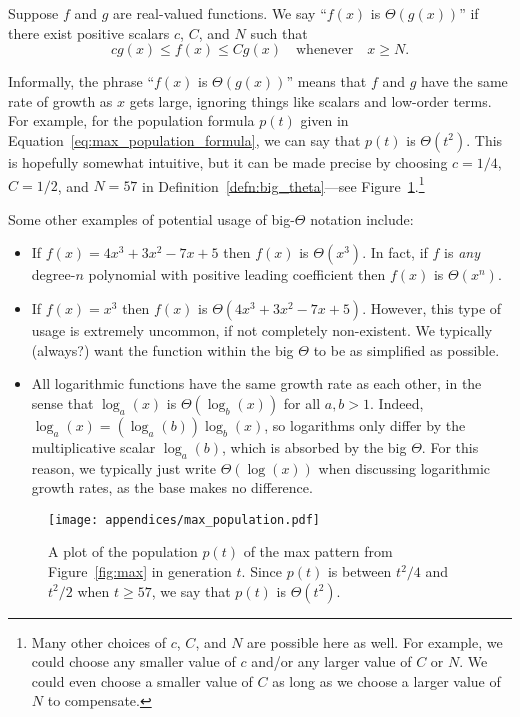 \begin{definition}\label{defn:big_theta}
	Suppose $f$ and $g$ are real-valued functions. We say ``$f(x)$ is $\Theta(g(x))$'' if there exist positive scalars $c$, $C$, and $N$ such that
	\[
		cg(x) \leq f(x) \leq Cg(x) \quad \text{whenever} \quad x \geq N.
	\]
\end{definition}

Informally, the phrase ``$f(x)$ is $\Theta(g(x))$'' means that $f$ and $g$ have the same rate of growth as $x$ gets large, ignoring things like scalars and low-order terms. For example, for the population formula $p(t)$ given in Equation~\eqref{eq:max_population_formula}, we can say that $p(t)$ is $\Theta(t^2)$. This is hopefully somewhat intuitive, but it can be made precise by choosing $c = 1/4$, $C = 1/2$, and $N = 57$ in Definition~\ref{defn:big_theta}---see Figure~\ref{fig:max_population_graph}.\footnote{Many other choices of $c$, $C$, and $N$ are possible here as well. For example, we could choose any smaller value of $c$ and/or any larger value of $C$ or $N$. We could even choose a smaller value of $C$ as long as we choose a larger value of $N$ to compensate.}

Some other examples of potential usage of big-$\Theta$ notation include:\smallskip

\begin{itemize}
	\item If $f(x) = 4x^3 + 3x^2 - 7x + 5$ then $f(x)$ is $\Theta(x^3)$. In fact, if $f$ is \emph{any} degree-$n$ polynomial with positive leading coefficient then $f(x)$ is $\Theta(x^n)$.\smallskip
	
	\item If $f(x) = x^3$ then $f(x)$ is $\Theta(4x^3 + 3x^2 - 7x + 5)$. However, this type of usage is extremely uncommon, if not completely non-existent. We typically (always?) want the function within the big $\Theta$ to be as simplified as possible.\smallskip
	
	\item All logarithmic functions have the same growth rate as each other, in the sense that $\log_a(x)$ is $\Theta(\log_b(x))$ for all $a,b > 1$. Indeed, $\log_a(x) = (\log_a(b))\log_b(x)$, so logarithms only differ by the multiplicative scalar $\log_a(b)$, which is absorbed by the big $\Theta$. For this reason, we typically just write $\Theta(\log(x))$ when discussing logarithmic growth rates, as the base makes no difference.
\end{itemize}

\begin{figure}[!htb]
\centering
\texttt{[image: appendices/max\_population.pdf]}
\caption{A plot of the population $p(t)$ of the max pattern from Figure~\ref{fig:max} in generation $t$. Since $p(t)$ is between $t^2/4$ and $t^2/2$ when $t \geq 57$, we say that $p(t)$ is $\Theta(t^2)$.}\label{fig:max_population_graph}
\end{figure}